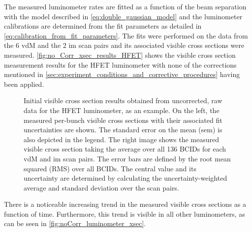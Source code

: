 The measured luminometer rates are fitted as a function of the beam separation with the model described in \autoref{eq:double_gaussian_model} and the luminometer calibrations are determined from the fit parameters as detailed in \autoref{eq:calibration_from_fit_parameters}. The fits were performed on the data from the 6 vdM and the 2 im scan pairs and its associated visible cross sections were measured. \autoref{fig:no_Corr_xsec_results_HFET} shows the visible cross section measurement results for the HFET luminometer with none of the corrections mentioned in \autoref{sec:experiment_conditions_and_corrective_procedures} having been applied.

\begin{figure}[!htb]
	\centering
	\caption[Initial HFET visible cross section results]{Initial visible cross section results obtained from uncorrected, raw data for the HFET luminometer, as an example. On the left, the measured per-bunch visible cross sections with their associated fit uncertainties are shown. The standard error on the mean (sem) is also depicted in the legend. The right image shows the measured visible cross section taking the average over all 136 BCIDs for each vdM and im scan pairs. The error bars are defined by the root mean squared (RMS) over all BCIDs. The central value and its uncertainty are determined by calculating the uncertainty-weighted average and standard deviation over the scan pairs.}
	\label{fig:no_Corr_xsec_results_HFET}
\end{figure}

There is a noticeable increasing trend in the measured visible cross sections as a function of time. Furthermore, this trend is visible in all other luminometers, as can be seen in \autoref{fig:noCorr_luminometer_xsec}.

